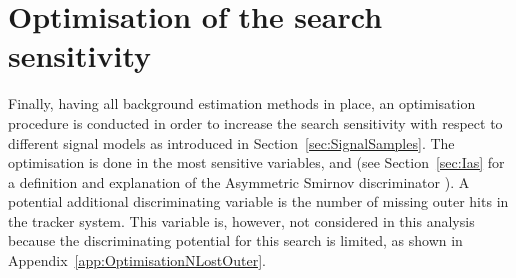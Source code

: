 
\FloatBarrier
\chapter{Optimisation of the search sensitivity}
\label{ch:Optimisation}
Finally, having all background estimation methods in place, an optimisation procedure is conducted in order to increase the search sensitivity with respect to different signal models as introduced in Section~\ref{sec:SignalSamples}.
The optimisation is done in the most sensitive variables, \pt and \ias (see Section~\ref{sec:Ias} for a definition and explanation of the Asymmetric Smirnov discriminator \ias).
A potential additional discriminating variable is the number of missing outer hits \nlostouter in the tracker system. 
This variable is, however, not considered in this analysis because the discriminating potential for this search is limited, as shown in Appendix~\ref{app:OptimisationNLostOuter}.\\

